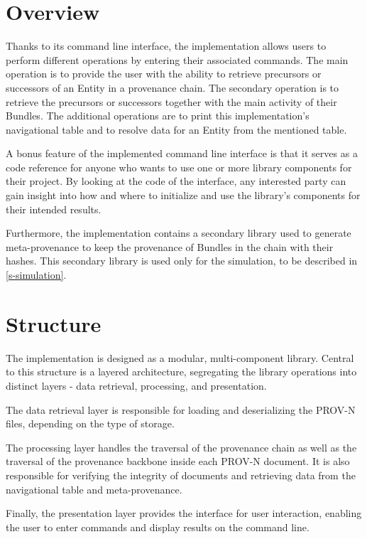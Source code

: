 \documentclass[
  digital,     %
  oneside,     %
  nosansbold,  %
  nocolorbold, %
  lof,         %
  lot,         %
]{fithesis4}
\begin{document}
\section{Overview}
Thanks to its command line interface, the implementation allows users to perform different operations by entering their associated commands. The main operation is to provide the user with the ability to retrieve precursors or successors of an Entity in a provenance chain. The secondary operation is to retrieve the precursors or successors together with the main activity of their Bundles. The additional operations are to print this implementation's navigational table and to resolve data for an Entity from the mentioned table.

A bonus feature of the implemented command line interface is that it serves as a code reference for anyone who wants to use one or more library components for their project. By looking at the code of the interface, any interested party can gain insight into how and where to initialize and use the library's components for their intended results.

Furthermore, the implementation contains a secondary library used to generate meta-provenance to keep the provenance of Bundles in the chain with their hashes. This secondary library is used only for the simulation, to be described in \ref{s-simulation}.

\section{Structure}
\shorthandoff{-}
The implementation is designed as a modular, multi-component library. Central to this structure is a layered architecture, segregating the library operations into distinct layers - data retrieval, processing, and presentation. 

The data retrieval layer is responsible for loading and deserializing the PROV-N files, depending on the type of storage. 

The processing layer handles the traversal of the provenance chain as well as the traversal of the provenance backbone inside each PROV-N document. It is also responsible for verifying the integrity of documents and retrieving data from the navigational table and meta-provenance.

Finally, the presentation layer provides the interface for user interaction, enabling the user to enter commands and display results on the command line.
\shorthandon{-}
\end{document}
